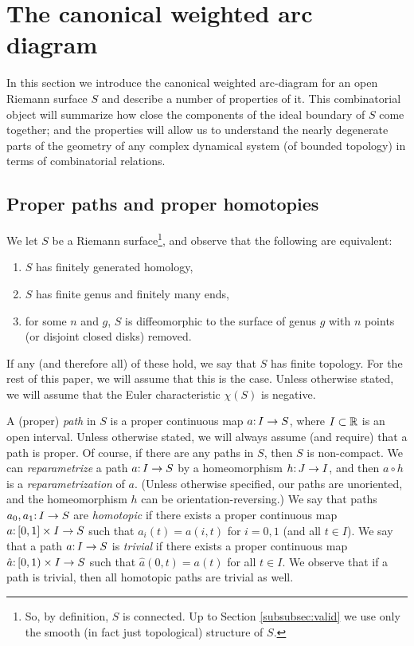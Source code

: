 
\section{The canonical weighted arc diagram} \label{sec:canonical}
In this section we introduce the canonical weighted arc-diagram for an open Riemann surface $S$ and describe a number of properties of it. 
This combinatorial object will summarize how close the components of the ideal boundary of $S$ come together;
and the properties will allow us to understand the nearly degenerate parts of the geometry of any complex dynamical system (of bounded topology)  
in terms of combinatorial relations.

\subsection{Proper paths and proper homotopies} \label{subsec:paths}
We let $S$ be a Riemann surface\footnote{So, by definition, $S$ is connected. Up to Section \ref{subsubsec:valid} we use only the smooth (in fact just topological) structure of $S$.}, 
and observe that the following are equivalent:
\begin{enumerate}
\item
$S$ has finitely generated homology,
\item
$S$ has finite genus and finitely many ends,
\item
for some $n$ and $g$, $S$ is diffeomorphic to the surface of genus $g$ with $n$ points (or disjoint closed disks) removed. 
\end{enumerate}
If any (and therefore all) of these hold, we say that $S$ has finite topology.
For the rest of this paper, we will assume that this is the case.
Unless otherwise stated, we will assume that the Euler characteristic $\chi(S)$ is negative.

A (proper) \emph{path} in $S$ is a proper continuous map $a \mathpunct: I \to S$, where $I \subset {\Bbb R}$ is an open interval. 
Unless otherwise stated, we will always assume (and require) that a path is proper. 
Of course, if there are any paths in $S$, then $S$ is non-compact.
We can \emph{reparametrize} a path $a\mathpunct: I \to S$ by a homeomorphism $h\mathpunct: J \to I$, 
and then $a \circ h$ is a \emph{reparametrization} of $a$. 
(Unless otherwise specified, our paths are unoriented, and the homeomorphism $h$ can be orientation-reversing.)
We say that paths $a_0, a_1\mathpunct: I \to S$ are \emph{homotopic} 
if there exists a proper continuous map $a\mathpunct:  [0, 1] \times I \to S$ such that $a_i(t) = a(i, t)$ for $i = 0, 1$ (and all $t \in I$).
We say that a path $a\mathpunct: I \to S$ is \emph{trivial} if there exists a proper continuous map $\hat a\mathpunct:  [0, 1) \times I \to S$ such that 
$\hat a(0, t) = a(t)$ for all $t \in I$. 
We observe that if a path is trivial, then all homotopic paths are trivial as well.


